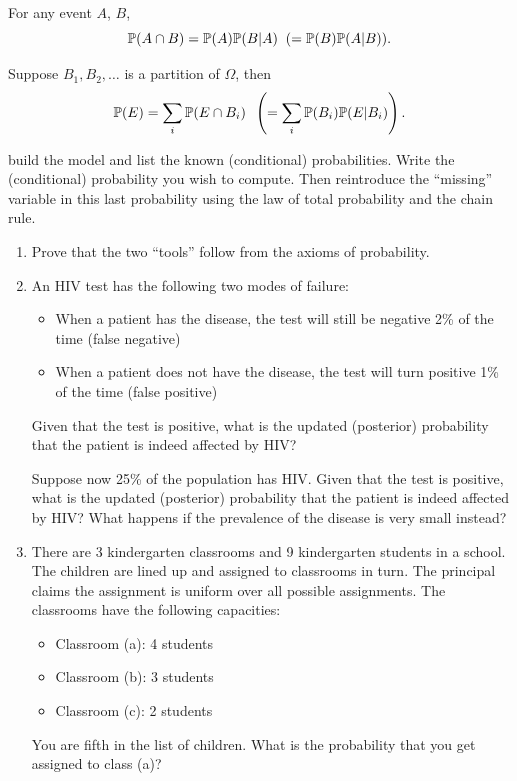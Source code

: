 \documentclass{article}
\begin{document}
 For any event $A$, $B$, 
\[\P(A \cap B) = \P(A) \P(B | A) \;\; (= \P(B) \P(A | B)).\] 

 Suppose $B_1, B_2, \dots$ is a partition of $\Omega$, then
\[ \P(E) = \sum_i \P(E \cap B_i) \;\; \left(= \sum_i \P(B_i) \P(E | B_i)\right). \]

 build the model and list the known (conditional) probabilities. Write the (conditional) probability you wish to compute. Then reintroduce the ``missing'' variable in this last probability using the law of total probability and the chain rule.  

\begin{enumerate}
	\item Prove that the two ``tools'' follow from the axioms of probability.
	\item An HIV test has the following two modes of failure:
	\begin{itemize}
		\item When a patient has the disease, the test will still be negative 2\% of the time (false negative)
		\item When a patient does not have the disease, the test will turn positive 1\% of the time (false positive)
	\end{itemize}
	Given that the test is positive, what is the updated (posterior) probability that the patient is indeed affected by HIV?

	Suppose now 25\% of the population has HIV.
	Given that the test is positive, what is the updated (posterior) probability that the patient is indeed affected by HIV? What happens if the prevalence of the disease is very small instead?
	\item There are 3 kindergarten classrooms and 9 kindergarten students in a school. The children are lined up and assigned to classrooms in turn. The principal claims the assignment is uniform over all possible assignments. The classrooms 
	have the following capacities:

	\begin{itemize}
		\item Classroom (a): 4 students

		\item Classroom (b): 3 students
		\item Classroom (c): 2 students
	\end{itemize}

	You are fifth in the list of children. What is the probability that you get assigned to class (a)? 
\end{enumerate}
\end{document}
